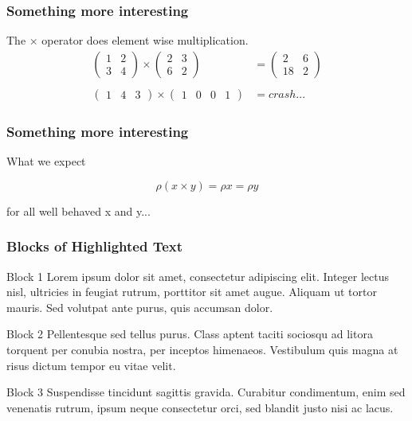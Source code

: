\documentclass{beamer}
\begin{document}
\begin{frame}
    \frametitle{Something more interesting}
    The $\times$ operator does element wise multiplication.\\
    \begin{align*}
    \begin{pmatrix} 1 & 2\\3 & 4\end{pmatrix} \times \begin{pmatrix} 2 & 3\\6 & 2\end{pmatrix} &=
    \begin{pmatrix} 2 & 6\\18 & 2\end{pmatrix}\\\\
    \begin{pmatrix} 1 & 4 & 3 \end{pmatrix} \times \begin{pmatrix}1 & 0 & 0 & 1 \end{pmatrix} &= crash...
    \end{align*}
\end{frame}

\begin{frame}
    \frametitle{Something more interesting}
    \centerline{What we expect}
    \begin{equation*}
        \rho (x \times y) = \rho x = \rho y
    \end{equation*}
    \centerline{for all well behaved x and y...}
\end{frame}

\begin{frame}
\frametitle{Blocks of Highlighted Text}
\begin{block}{Block 1}
Lorem ipsum dolor sit amet, consectetur adipiscing elit. Integer lectus nisl, ultricies in feugiat rutrum, porttitor sit amet augue. Aliquam ut tortor mauris. Sed volutpat ante purus, quis accumsan dolor.
\end{block}

\begin{block}{Block 2}
Pellentesque sed tellus purus. Class aptent taciti sociosqu ad litora torquent per conubia nostra, per inceptos himenaeos. Vestibulum quis magna at risus dictum tempor eu vitae velit.
\end{block}

\begin{block}{Block 3}
Suspendisse tincidunt sagittis gravida. Curabitur condimentum, enim sed venenatis rutrum, ipsum neque consectetur orci, sed blandit justo nisi ac lacus.
\end{block}
\end{frame}
\end{document}
